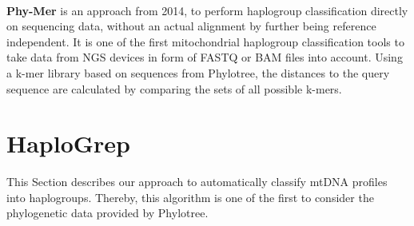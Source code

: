 \\
\textbf{Phy-Mer} is an approach from 2014, to perform haplogroup classification directly on sequencing data, without an actual alignment by further being reference independent. It is one of the first mitochondrial haplogroup classification tools to take data from NGS devices in form of FASTQ or BAM files into account. Using a k-mer library based on sequences from Phylotree, the distances to the query sequence are calculated by comparing the sets of all possible k-mers. \\

\section{HaploGrep}\label{hg:haplogrep}
This Section describes our approach to automatically classify mtDNA profiles into haplogroups. Thereby, this algorithm is one of the first to consider the phylogenetic data provided by Phylotree.
